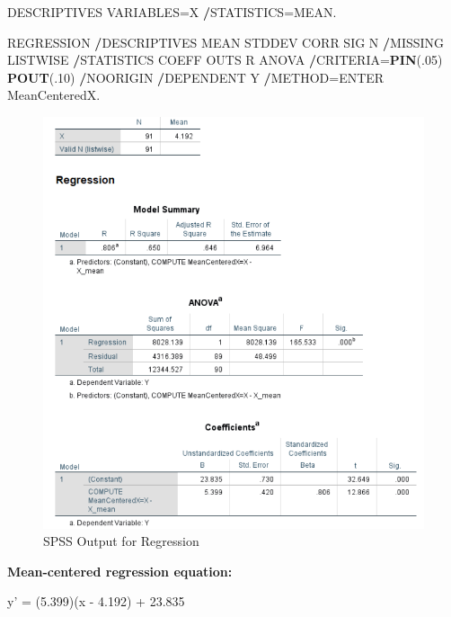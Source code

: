 \documentclass[
]{book}
\newenvironment{Shaded}{\begin{snugshade}}{\end{snugshade}}
\newcommand{\DecValTok}[1]{\textcolor[rgb]{0.00,0.00,0.81}{#1}}
\newcommand{\KeywordTok}[1]{\textcolor[rgb]{0.13,0.29,0.53}{\textbf{#1}}}
\newcommand{\NormalTok}[1]{#1}
\newcommand{\OperatorTok}[1]{\textcolor[rgb]{0.81,0.36,0.00}{\textbf{#1}}}
\begin{document}
\begin{Shaded}
\begin{Highlighting}[]
\NormalTok{DESCRIPTIVES VARIABLES=X}
  \OperatorTok{/}\NormalTok{STATISTICS=MEAN.}


\NormalTok{REGRESSION}
  \OperatorTok{/}\NormalTok{DESCRIPTIVES MEAN STDDEV CORR SIG N}
  \OperatorTok{/}\NormalTok{MISSING LISTWISE}
  \OperatorTok{/}\NormalTok{STATISTICS COEFF OUTS R ANOVA}
  \OperatorTok{/}\NormalTok{CRITERIA=}\KeywordTok{PIN}\NormalTok{(.}\DecValTok{05}\NormalTok{) }\KeywordTok{POUT}\NormalTok{(.}\DecValTok{10}\NormalTok{)}
  \OperatorTok{/}\NormalTok{NOORIGIN }
  \OperatorTok{/}\NormalTok{DEPENDENT Y}
  \OperatorTok{/}\NormalTok{METHOD=ENTER MeanCenteredX.}
\end{Highlighting}
\end{Shaded}

\begin{figure}[!h]
\includegraphics{Screenshots/Regression/RegressionSPSS} \caption{\label{fig:RegressionSPSS}SPSS Output for Regression}\label{fig:RegressionSPSS}
\end{figure}

\textbf{Mean-centered regression equation:}

y' = (5.399)(x - 4.192) + 23.835
\end{document}
